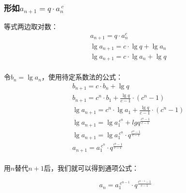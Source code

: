 \documentclass[UTF8]{ctexart}
\begin{document}
\newpage

\subsubsection{形如{\large$a_{n+1}=q\cdot a_n^{~c}$}}
    等式两边取对数：
    \setcounter{equation}{0}
    \begin{align}
        &a_{n+1}=q\cdot a_n^c\\[3mm]
        &\lg{a_{n+1}}=c\cdot \lg{q}+\lg{a_n}\\[3mm]
        &\lg{a_{n+1}}=c\cdot \lg{a_n}+\lg{q}
    \end{align}\\
    令$b_n=\lg{a_n}$，使用待定系数法的公式：
    \begin{align}
        &b_{n+1}=c\cdot b_n+\lg{q}\\[3mm]
        &b_{n+1}=c^n\cdot b_1+\frac{\lg{q}}{c-1}\cdot\left(c^n-1\right)\\[3mm]
        &\lg{a_{n+1}}=c^n\cdot \lg{a_1}+\frac{\lg{q}}{c-1}\cdot\left(c^n-1\right)\\[3mm]
        &\lg{a_{n+1}}=\lg{a_1^{~c^{n}}}+lg{q^{\frac{c^n-1}{c-1}}}\\[3mm]
        &\lg{a_{n+1}}=\lg{a_1^{~c^{n}}\cdot q^{\frac{c^n-1}{c-1}}}\\[3mm]
        &a_{n+1}=a_1^{~c^{n}}\cdot q^{\frac{c^n-1}{c-1}}
    \end{align}\\
    用$n$替代$n+1$后，我们就可以得到通项公式：
    \begin{large}
    \begin{equation*}
        a_{n}=a_1^{~c^{n-1}}\cdot q^{\frac{c^{n-1}-1}{c-1}}
    \end{equation*}
    \end{large}

\newpage
\end{document}
